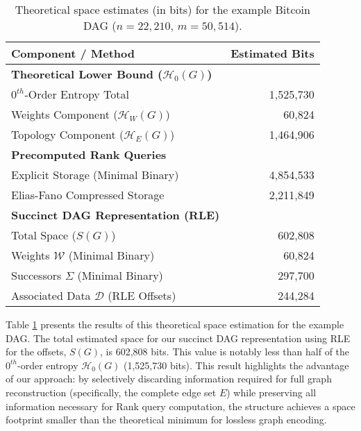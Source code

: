 \begin{table}[htbp]
    \centering
    \small
    \begin{tabular}{l r}
        \toprule
        Component / Method                                      & Estimated Bits \\
        \midrule
        \textbf{Theoretical Lower Bound ($\mathcal{H}_0(G)$)}   &                \\
        \quad $0^{th}$-Order Entropy Total                      & 1,525,730      \\
        \quad \quad Weights Component ($\mathcal{H}_W(G)$)      & 60,824         \\
        \quad \quad Topology Component ($\mathcal{H}_E(G)$)     & 1,464,906      \\
        \midrule
        \textbf{Precomputed Rank Queries}                       &                \\
        \quad Explicit Storage (Minimal Binary)                 & 4,854,533      \\
        \quad Elias-Fano Compressed Storage                     & 2,211,849      \\
        \midrule
        \textbf{Succinct DAG Representation (RLE)}              &                \\
        \quad Total Space ($S(G)$)                              & 602,808        \\
        \quad \quad Weights $\mathcal{W}$ (Minimal Binary)      & 60,824         \\
        \quad \quad Successors $\Sigma$ (Minimal Binary)        & 297,700        \\
        \quad \quad Associated Data $\mathcal{D}$ (RLE Offsets) & 244,284        \\
        \bottomrule
    \end{tabular}
    \caption{Theoretical space estimates (in bits) for the example Bitcoin DAG ($n=22,210$, $m=50,514$).}
    \label{tab:space_estimates_bitcoin}
\end{table}

Table \ref{tab:space_estimates_bitcoin} presents the results of this theoretical space estimation for the example DAG. The total estimated space for our succinct DAG representation using RLE for the offsets, $S(G)$, is 602,808 bits. This value is notably less than half of the $0^{th}$-order entropy $\mathcal{H}_0(G)$ (1,525,730 bits). This result highlights the advantage of our approach: by selectively discarding information required for full graph reconstruction (specifically, the complete edge set $E$) while preserving all information necessary for Rank query computation, the structure achieves a space footprint smaller than the theoretical minimum for lossless graph encoding.

